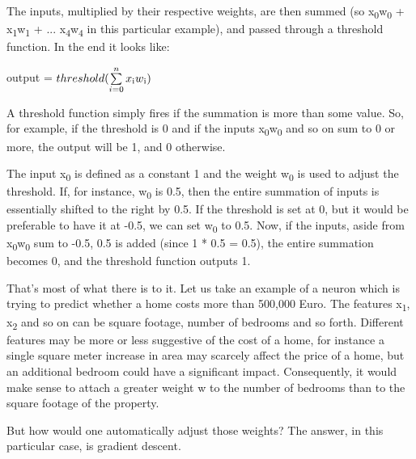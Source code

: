 \documentclass[a4paper, 12pt]{article}
\begin{document}
                        \par The inputs, multiplied by their respective weights, are then summed (so x\textsubscript{0}w\textsubscript{0} + x\textsubscript{1}w\textsubscript{1} + ... x\textsubscript{4}w\textsubscript{4} in this particular example), and passed through a threshold function. In the end it looks like:
                        
                        \par \centerline{ {\large output = \(threshold(\sum\limits_{i=0}^n x\textsubscript{i}w\textsubscript{i})\) } }
                        
                        \bigskip
                        
                        \par A threshold function simply fires if the summation is more than some value. So, for example, if the threshold is 0 and if the inputs x\textsubscript{0}w\textsubscript{0} and so on sum to 0 or more, the output will be 1, and 0 otherwise.
                        
                        \par The input x\textsubscript{0} is defined as a constant 1 and the weight w\textsubscript{0} is used to adjust the threshold. If, for instance, w\textsubscript{0} is 0.5, then the entire summation of inputs is essentially shifted to the right by 0.5. If the threshold is set at 0, but it would be preferable to have it at -0.5, we can set w\textsubscript{0} to 0.5. Now, if the inputs, aside from x\textsubscript{0}w\textsubscript{0} sum to -0.5, 0.5 is added (since 1 * 0.5 = 0.5), the entire summation becomes 0, and the threshold function outputs 1.
                    
                        \par That's most of what there is to it. Let us take an example of a neuron which is trying to predict whether a home costs more than 500,000 Euro. The features x\textsubscript{1}, x\textsubscript{2} and so on can be square footage, number of bedrooms and so forth. Different features may be more or less suggestive of the cost of a home, for instance a single square meter increase in area may scarcely affect the price of a home, but an additional bedroom could have a significant impact. Consequently, it would make sense to attach a greater weight w to the number of bedrooms than to the square footage of the property.
                        
                        \par But how would one automatically adjust those weights? The answer, in this particular case, is gradient descent.
                        
\end{document}
